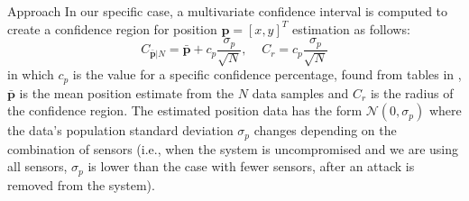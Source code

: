 \begin{section}{Approach}
In our specific case, a multivariate confidence interval is computed to create a confidence region for position $\bm{p}=[x,y]^T$ estimation as follows: 
 \begin{equation}
    \label{Confidence_region}
		C_{\bar{\bm{p}}|N} = \bar{\bm{p}} + c_p\frac{\sigma_p}{\sqrt{N}}, \;\;\;\;C_r = c_p\frac{\sigma_p}{\sqrt{N}}
	\end{equation}
in which  $c_p$ is the value for a specific confidence percentage, found from tables in \cite{devore2011probability}, $\bar{\bm{p}}$ is the mean position estimate from the $N$ data samples and $C_r$ is the radius of the confidence region.
The estimated position data has the form $\mathcal{N}(0,\sigma_p)$ where the data's population standard deviation $\sigma_p$ changes depending on the combination of sensors (i.e., when the system is uncompromised and we are using all sensors, $\sigma_p$ is lower than the case with fewer sensors, after an attack is removed from the system). 







\end{section}
